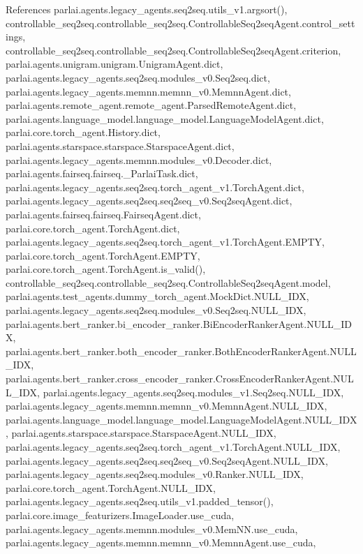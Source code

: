 References parlai.\+agents.\+legacy\+\_\+agents.\+seq2seq.\+utils\+\_\+v1.\+argsort(), controllable\+\_\+seq2seq.\+controllable\+\_\+seq2seq.\+Controllable\+Seq2seq\+Agent.\+control\+\_\+settings, controllable\+\_\+seq2seq.\+controllable\+\_\+seq2seq.\+Controllable\+Seq2seq\+Agent.\+criterion, parlai.\+agents.\+unigram.\+unigram.\+Unigram\+Agent.\+dict, parlai.\+agents.\+legacy\+\_\+agents.\+seq2seq.\+modules\+\_\+v0.\+Seq2seq.\+dict, parlai.\+agents.\+legacy\+\_\+agents.\+memnn.\+memnn\+\_\+v0.\+Memnn\+Agent.\+dict, parlai.\+agents.\+remote\+\_\+agent.\+remote\+\_\+agent.\+Parsed\+Remote\+Agent.\+dict, parlai.\+agents.\+language\+\_\+model.\+language\+\_\+model.\+Language\+Model\+Agent.\+dict, parlai.\+core.\+torch\+\_\+agent.\+History.\+dict, parlai.\+agents.\+starspace.\+starspace.\+Starspace\+Agent.\+dict, parlai.\+agents.\+legacy\+\_\+agents.\+memnn.\+modules\+\_\+v0.\+Decoder.\+dict, parlai.\+agents.\+fairseq.\+fairseq.\+\_\+\+Parlai\+Task.\+dict, parlai.\+agents.\+legacy\+\_\+agents.\+seq2seq.\+torch\+\_\+agent\+\_\+v1.\+Torch\+Agent.\+dict, parlai.\+agents.\+legacy\+\_\+agents.\+seq2seq.\+seq2seq\+\_\+v0.\+Seq2seq\+Agent.\+dict, parlai.\+agents.\+fairseq.\+fairseq.\+Fairseq\+Agent.\+dict, parlai.\+core.\+torch\+\_\+agent.\+Torch\+Agent.\+dict, parlai.\+agents.\+legacy\+\_\+agents.\+seq2seq.\+torch\+\_\+agent\+\_\+v1.\+Torch\+Agent.\+E\+M\+P\+TY, parlai.\+core.\+torch\+\_\+agent.\+Torch\+Agent.\+E\+M\+P\+TY, parlai.\+core.\+torch\+\_\+agent.\+Torch\+Agent.\+is\+\_\+valid(), controllable\+\_\+seq2seq.\+controllable\+\_\+seq2seq.\+Controllable\+Seq2seq\+Agent.\+model, parlai.\+agents.\+test\+\_\+agents.\+dummy\+\_\+torch\+\_\+agent.\+Mock\+Dict.\+N\+U\+L\+L\+\_\+\+I\+DX, parlai.\+agents.\+legacy\+\_\+agents.\+seq2seq.\+modules\+\_\+v0.\+Seq2seq.\+N\+U\+L\+L\+\_\+\+I\+DX, parlai.\+agents.\+bert\+\_\+ranker.\+bi\+\_\+encoder\+\_\+ranker.\+Bi\+Encoder\+Ranker\+Agent.\+N\+U\+L\+L\+\_\+\+I\+DX, parlai.\+agents.\+bert\+\_\+ranker.\+both\+\_\+encoder\+\_\+ranker.\+Both\+Encoder\+Ranker\+Agent.\+N\+U\+L\+L\+\_\+\+I\+DX, parlai.\+agents.\+bert\+\_\+ranker.\+cross\+\_\+encoder\+\_\+ranker.\+Cross\+Encoder\+Ranker\+Agent.\+N\+U\+L\+L\+\_\+\+I\+DX, parlai.\+agents.\+legacy\+\_\+agents.\+seq2seq.\+modules\+\_\+v1.\+Seq2seq.\+N\+U\+L\+L\+\_\+\+I\+DX, parlai.\+agents.\+legacy\+\_\+agents.\+memnn.\+memnn\+\_\+v0.\+Memnn\+Agent.\+N\+U\+L\+L\+\_\+\+I\+DX, parlai.\+agents.\+language\+\_\+model.\+language\+\_\+model.\+Language\+Model\+Agent.\+N\+U\+L\+L\+\_\+\+I\+DX, parlai.\+agents.\+starspace.\+starspace.\+Starspace\+Agent.\+N\+U\+L\+L\+\_\+\+I\+DX, parlai.\+agents.\+legacy\+\_\+agents.\+seq2seq.\+torch\+\_\+agent\+\_\+v1.\+Torch\+Agent.\+N\+U\+L\+L\+\_\+\+I\+DX, parlai.\+agents.\+legacy\+\_\+agents.\+seq2seq.\+seq2seq\+\_\+v0.\+Seq2seq\+Agent.\+N\+U\+L\+L\+\_\+\+I\+DX, parlai.\+agents.\+legacy\+\_\+agents.\+seq2seq.\+modules\+\_\+v0.\+Ranker.\+N\+U\+L\+L\+\_\+\+I\+DX, parlai.\+core.\+torch\+\_\+agent.\+Torch\+Agent.\+N\+U\+L\+L\+\_\+\+I\+DX, parlai.\+agents.\+legacy\+\_\+agents.\+seq2seq.\+utils\+\_\+v1.\+padded\+\_\+tensor(), parlai.\+core.\+image\+\_\+featurizers.\+Image\+Loader.\+use\+\_\+cuda, parlai.\+agents.\+legacy\+\_\+agents.\+memnn.\+modules\+\_\+v0.\+Mem\+N\+N.\+use\+\_\+cuda, parlai.\+agents.\+legacy\+\_\+agents.\+memnn.\+memnn\+\_\+v0.\+Memnn\+Agent.\+use\+\_\+cuda, 